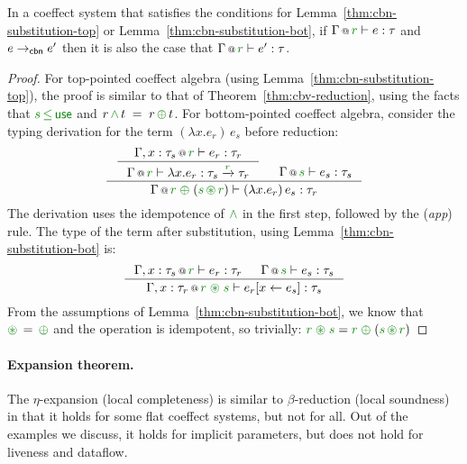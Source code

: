 \begin{theorem}
\label{thm:cbn-flat}
In a coeffect system that satisfies the conditions for Lemma~\ref{thm:cbn-substitution-top} or
Lemma~\ref{thm:cbn-substitution-bot}, if $\coctx{\Gamma}{\cclrd{r}} \vdash e : \tau$
and $e \rightarrow_{\textnormal{\sffamily cbn}} e'$ then it is also the case that $\coctx{\Gamma}{\cclrd{r}} \vdash e' : \tau$.
\end{theorem}
\begin{proof}

For top-pointed coeffect algebra (using Lemma~\ref{thm:cbn-substitution-top}), the proof is similar
to that of Theorem~\ref{thm:cbv-reduction}, using the facts that $\cclrd{s} \,\cleq\, \cunit$
and $r \,\czip\, t \;=\; r \,\cpar\, t$.
For bottom-pointed coeffect algebra, consider the typing derivation for the term
$(\lambda x.e_r)\,e_s$ before reduction:
%
\begin{equation*}
\inference
  { \inference
      {\coctx{\Gamma, x:\tau_s}{\cclrd{r}} \vdash e_r : \tau_r}
      {\coctx{\Gamma}{\cclrd{r}} \vdash \lambda x.e_r : \tau_s \xrightarrow{\cclrd{r}} \tau_r } &
   \coctx{\Gamma}{\cclrd{s}} \vdash e_s : \tau_s }
  {\coctx{\Gamma}{\cclrd{r} \;\cpar\; (\cclrd{s} \,\cseq\, \cclrd{r})} \vdash (\lambda x.e_r)\,e_s : \tau_r }
\end{equation*}
%
The derivation uses the idempotence of $\czip$ in the first step, followed by the
(\emph{app}) rule. The type of the term after substitution, using Lemma~\ref{thm:cbn-substitution-bot} is:
%
\begin{equation*}
\inference
  { \coctx{\Gamma, x:\tau_s}{\cclrd{r}} \vdash e_r : \tau_r &
    \coctx{\Gamma}{\cclrd{s}} \vdash e_s : \tau_s }
  { \coctx{\Gamma, x:\tau_r}{\cclrd{r}\;\cseq\;\cclrd{s}} \vdash \subst{e_r}{x}{e_s} : \tau_s }
\end{equation*}
%
From the assumptions of Lemma~\ref{thm:cbn-substitution-bot}, we know that $\cseq\,=\,\cpar$
and the operation is idempotent, so trivially:
$\cclrd{r}\;\cseq\;\cclrd{s} = \cclrd{r} \;\cpar\; (\cclrd{s} \,\cseq\, \cclrd{r})$
\end{proof}

\paragraph{Expansion theorem.}
The $\eta$-expansion (local completeness) is similar to $\beta$-reduction (local soundness) in that
it holds for some flat coeffect systems, but not for all. Out of the examples we discuss, it
holds for implicit parameters, but does not hold for liveness and dataflow.

